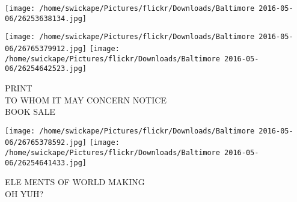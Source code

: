 \documentclass[10pt,letterpaper]{article}
\begin{document}
\texttt{[image: /home/swickape/Pictures/flickr/Downloads/Baltimore 2016-05-06/26253638134.jpg]}

\vspace{0.25in}
\texttt{[image: /home/swickape/Pictures/flickr/Downloads/Baltimore 2016-05-06/26765379912.jpg]}
\texttt{[image: /home/swickape/Pictures/flickr/Downloads/Baltimore 2016-05-06/26254642523.jpg]}

PRINT\\
TO WHOM IT MAY CONCERN NOTICE\\
BOOK SALE
\pagebreak

\texttt{[image: /home/swickape/Pictures/flickr/Downloads/Baltimore 2016-05-06/26765378592.jpg]}
\texttt{[image: /home/swickape/Pictures/flickr/Downloads/Baltimore 2016-05-06/26254641433.jpg]}

ELE MENTS OF WORLD MAKING\\
OH YUH?
\pagebreak
\end{document}
